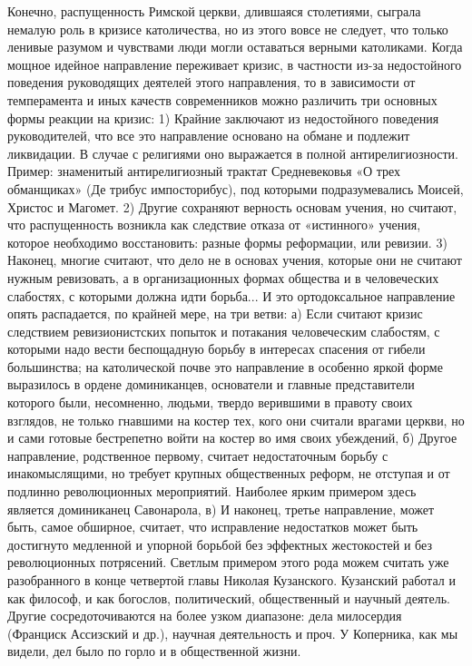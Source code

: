 Конечно, распущенность  Римской церкви, длившаяся  столетиями, сыграла
немалую роль в кризисе католичества, но из этого вовсе не следует, что
только  ленивые  разумом и  чувствами  люди  могли оставаться  верными
католиками.  Когда мощное  идейное  направление  переживает кризис,  в
частности  из-за  недостойного  поведения руководящих  деятелей  этого
направления,  то   в  зависимости  от  темперамента   и  иных  качеств
современников можно  различить три  основных формы реакции  на кризис:
1)  Крайние заключают  из  недостойного  поведения руководителей,  что
все  это  направление основано  на  обмане  и подлежит  ликвидации.  В
случае с религиями оно  выражается в полной антирелигиозности. Пример:
знаменитый антирелигиозный  трактат Средневековья «О  трех обманщиках»
(Де трибус импосторибус), под которыми подразумевались Моисей, Христос
и Магомет.  2) Другие сохраняют  верность основам учения,  но считают,
что распущенность возникла как следствие отказа от «истинного» учения,
которое необходимо восстановить: разные формы реформации, или ревизии.
3) Наконец, многие считают, что дело  не в основах учения, которые они
не  считают нужным  ревизовать,  а в  организационных формах  общества
и  в  человеческих  слабостях,  с которыми  должна  идти  борьба...  И
это  ортодоксальное направление  опять распадается,  по крайней  мере,
на  три  ветви:  а)  Если считают  кризис  следствием  ревизионистских
попыток  и потакания  человеческим  слабостям, с  которыми надо  вести
беспощадную  борьбу в  интересах  спасения от  гибели большинства;  на
католической почве это направление в особенно яркой форме выразилось в
ордене доминиканцев, основатели и главные представители которого были,
несомненно,  людьми, твердо  верившими  в правоту  своих взглядов,  не
только гнавшими на  костер тех, кого они считали врагами  церкви, но и
сами готовые  бестрепетно войти на  костер во имя своих  убеждений, б)
Другое направление, родственное  первому, считает недостаточным борьбу
с инакомыслящими, но требует  крупных общественных реформ, не отступая
и от подлинно революционных мероприятий. Наиболее ярким примером здесь
является  доминиканец Савонарола,  в) И  наконец, третье  направление,
может быть, самое обширное, считает, что исправление недостатков может
быть достигнуто медленной и  упорной борьбой без эффектных жестокостей
и  без революционных  потрясений.  Светлым примером  этого рода  можем
считать уже  разобранного в конце четвертой  главы Николая Кузанского.
Кузанский  работал  и  как  философ,  и  как  богослов,  политический,
общественный  и научный  деятель.  Другие  сосредоточиваются на  более
узком диапазоне:  дела милосердия (Франциск Ассизский  и др.), научная
деятельность и проч. У Коперника, как мы видели, дел было по горло и в
общественной жизни.

